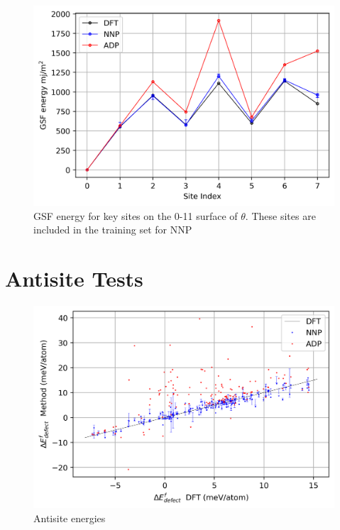\documentclass{article}
\begin{document}
%


\begin{figure}[H]%
\centering%
\includegraphics[width=540px]{./figures/NOTINOQMD_00001-GSF_0m11.png}%
\caption{GSF energy for key sites on the 0-11 surface of  $\theta$. These sites are included in the training set for NNP}%
\end{figure}

%
\section{Antisite Tests \newline%
}%
\label{sec:AntisiteTests}%


\begin{figure}[H]%
\centering%
\includegraphics[width=540px]{./figures/antisite_plot.png}%
\caption{Antisite energies}%
\end{figure}
\end{document}
